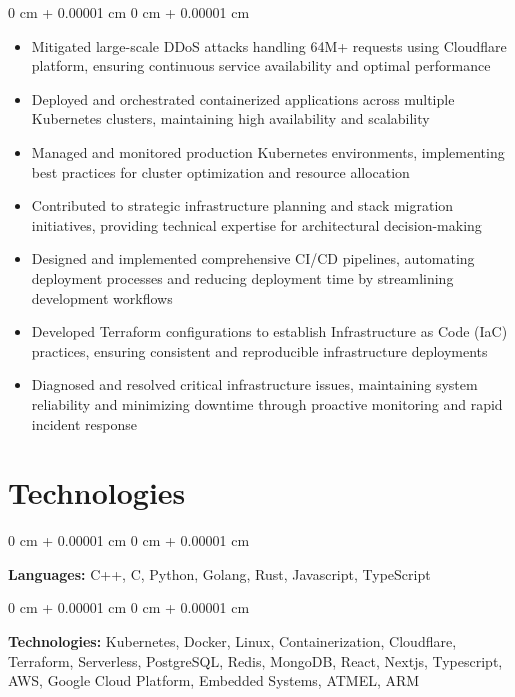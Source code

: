\documentclass[10pt, a4paper]{article}
\newenvironment{highlights}{
    \begin{itemize}[
        topsep=0.10 cm,
        parsep=0.10 cm,
        partopsep=0pt,
        itemsep=0pt,
        leftmargin=0 cm + 10pt
    ]
}{
    \end{itemize}
} %
\newenvironment{onecolentry}{
    \begin{adjustwidth}{
        0 cm + 0.00001 cm
    }{
        0 cm + 0.00001 cm
    }
}{
    \end{adjustwidth}
} %
\begin{document}
        \vspace{0.10 cm}
        \begin{onecolentry}
            \begin{highlights}
                \item Mitigated large-scale DDoS attacks handling 64M+ requests using Cloudflare platform, ensuring continuous service availability and optimal performance
                \item Deployed and orchestrated containerized applications across multiple Kubernetes clusters, maintaining high availability and scalability
                \item Managed and monitored production Kubernetes environments, implementing best practices for cluster optimization and resource allocation
                \item Contributed to strategic infrastructure planning and stack migration initiatives, providing technical expertise for architectural decision-making
                \item Designed and implemented comprehensive CI/CD pipelines, automating deployment processes and reducing deployment time by streamlining development workflows
                \item Developed Terraform configurations to establish Infrastructure as Code (IaC) practices, ensuring consistent and reproducible infrastructure deployments
                \item Diagnosed and resolved critical infrastructure issues, maintaining system reliability and minimizing downtime through proactive monitoring and rapid incident response
            \end{highlights}
        \end{onecolentry}
    
    \section{Technologies}

        \begin{onecolentry}
            \textbf{Languages:} C++, C, Python, Golang, Rust, Javascript, TypeScript 
        \end{onecolentry}

        \vspace{0.2 cm}

        \begin{onecolentry}
            \textbf{Technologies:} Kubernetes, Docker, Linux, Containerization, Cloudflare, Terraform, Serverless, PostgreSQL, Redis, MongoDB, React, Nextjs, Typescript, AWS, Google Cloud Platform, Embedded Systems, ATMEL, ARM
        \end{onecolentry}
\end{document}
